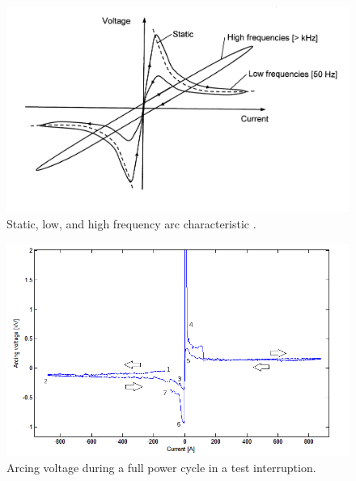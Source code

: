 \documentclass[10pt,b5paper,twoside]{article}
\begin{document}
\begin{figure}[H]
\centering
\includegraphics[scale=1]{Bilder/Theory/dynamicArcingVoltage.png}
\caption{Static, low, and high frequency arc characteristic  \cite{bib:HVEbreak}.} \label{fig:arcingVoltageFre}
\end{figure}

\begin{figure}[H]
\centering
\includegraphics[scale=0.7]{Bilder/Theory/arcingVoltagevzCurrent3.png}
\caption{Arcing voltage during a full power cycle in a test interruption.} \label{fig:arcingVoltageVSCurrent}
\end{figure}
\end{document}
